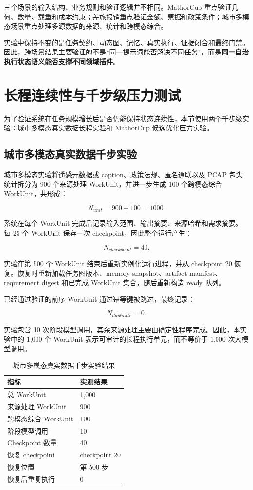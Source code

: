 \documentclass[UTF8,a4paper,12pt,oneside]{ctexbook}
\begin{document}
三个场景的输入结构、业务规则和验证逻辑并不相同。MathorCup 重点验证几何、数量、载重和成本约束；差旅报销重点验证金额、票据和政策条件；城市多模态场景重点处理多源数据的来源、统计和跨模态综合。

实验中保持不变的是任务契约、动态图、记忆、真实执行、证据闭合和最终门禁。因此，跨场景结果主要验证的不是“同一提示词能否解决不同任务”，而是\textbf{同一自治执行状态语义能否支撑不同领域插件}。


\section{长程连续性与千步级压力测试}

为了验证系统在任务规模增长后是否仍能保持状态连续性，本节使用两个千步级实验：城市多模态真实数据长程实验和 MathorCup 候选优化压力实验。


\subsection{城市多模态真实数据千步实验}

城市多模态实验将遥感元数据或 caption、政策法规、匿名通联以及 PCAP 包头统计拆分为 900 个来源处理 WorkUnit，并进一步生成 100 个跨模态综合 WorkUnit，共形成：

\[
N_{unit}=900+100=1000.
\]

系统在每个 WorkUnit 完成后记录输入范围、输出摘要、来源哈希和需求摘要。每 25 个 WorkUnit 保存一次 checkpoint，因此整个运行产生：

\[
N_{checkpoint}=40.
\]

实验在第 500 个 WorkUnit 结束后重新实例化运行进程，并从 checkpoint 20 恢复。恢复时重新加载任务图版本、memory snapshot、artifact manifest、requirement digest 和已完成 WorkUnit 集合，随后重新构造 ready 队列。

已经通过验证的前序 WorkUnit 通过幂等键被跳过，最终记录：

\[
N_{duplicate}=0.
\]

实验包含 10 次阶段模型调用，其余来源处理主要由确定性程序完成。因此，本实验中的 1,000 个 WorkUnit 表示可审计的长程执行单元，而不等价于 1,000 次大模型调用。

\begin{table}[htbp]
\centering
\caption{城市多模态真实数据千步实验结果}
\label{tab:urban-1000-results}
\begin{tabular}{p{}p{}}
\toprule
指标 & 实测结果\\
\midrule
总 WorkUnit & 1,000\\
来源处理 WorkUnit & 900\\
跨模态综合 WorkUnit & 100\\
阶段模型调用 & 10\\
Checkpoint 数量 & 40\\
恢复 checkpoint & checkpoint 20\\
恢复位置 & 第 500 步\\
恢复后重复执行 & 0\\
\bottomrule
\end{tabular}
\end{table}
\end{document}
